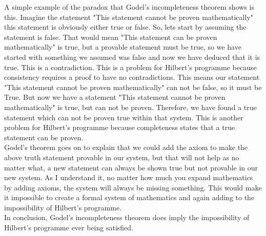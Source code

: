 \documentclass[a4paper,12pt]{article}
\begin{document}
A simple example of the paradox that Godel's incompleteness theorem shows is this. Imagine the statement "This statement cannot be proven mathematically" this statement is obviously either true or false. So, lets start by assuming the statement is false. That would mean "This statement can be proven mathematically" is true, but a provable statement must be true, so we have started with something we assumed was false and now we have deduced that it is true. This is a contradiction. This is a problem for Hilbert's programme because consistency requires a proof to have no contradictions. This means our statement "This statement cannot be proven mathematically" can not be false, so it must be True. But now we have a statement "This statement cannot be proven mathematically" is true, but can not be proven. Therefore, we have found a true statement which can not be proven true within that system. This is another problem for Hilbert's programme because completeness states that a true statement can be proven.  \\

Godel's theorem goes on to explain that we could add the axiom to make the above truth statement provable in our system, but that will not help as no matter what, a new statement can always be shown true but not provable in our new system. As I understand it, no matter how much you expand mathematics by adding axioms, the system will always be missing something. This would make it impossible to create a formal system of mathematics and again adding to the impossibility of Hilbert's programme. \\

In conclusion, Godel's incompleteness theorem does imply the impossibility of Hilbert's programme ever being satisfied.
\end{document}
